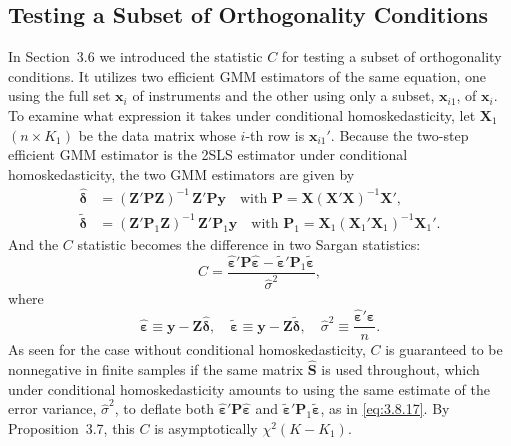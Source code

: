 \subsection*{Testing a Subset of Orthogonality Conditions}

In Section~3.6 we introduced the statistic $C$ for testing a subset of orthogonality
conditions.  It utilizes two efficient GMM estimators of the same equation, one
using the full set $\mathbf{x}_i$ of instruments and the other using only a subset, $\mathbf{x}_{i1}$,
of $\mathbf{x}_i$.  To examine what expression it takes under conditional homoskedasticity, let
$\mathbf{X}_1$ $(n \times K_1)$ be the data matrix whose $i$-th row is $\mathbf{x}_{i1}'$.  Because the
two-step efficient GMM estimator is the 2SLS estimator under conditional homoskedasticity,
the two GMM estimators are given by
\begin{align}
  \hat{\boldsymbol{\delta}}
  &= (\mathbf{Z}'\mathbf{P}\mathbf{Z})^{-1}\, \mathbf{Z}'\mathbf{P}\mathbf{y}
  \quad \text{with } \mathbf{P}
  = \mathbf{X}(\mathbf{X}'\mathbf{X})^{-1}\mathbf{X}',
  \label{eq:3.8.15} \\
  \tilde{\boldsymbol{\delta}}
  &= (\mathbf{Z}'\mathbf{P}_1\mathbf{Z})^{-1}\, \mathbf{Z}'\mathbf{P}_1\mathbf{y}
  \quad \text{with } \mathbf{P}_1
  = \mathbf{X}_1(\mathbf{X}_1'\mathbf{X}_1)^{-1}\mathbf{X}_1'.
  \label{eq:3.8.16}
\end{align}
And the $C$ statistic becomes the difference in two Sargan statistics:
\begin{equation}
  C = \frac{\hat{\boldsymbol{\varepsilon}}'\mathbf{P}\hat{\boldsymbol{\varepsilon}}
    - \tilde{\boldsymbol{\varepsilon}}'\mathbf{P}_1\tilde{\boldsymbol{\varepsilon}}}
    {\hat{\sigma}^2},
  \label{eq:3.8.17}
\end{equation}
where
\[
  \hat{\boldsymbol{\varepsilon}} \equiv \mathbf{y}
  - \mathbf{Z}\hat{\boldsymbol{\delta}}, \quad
  \tilde{\boldsymbol{\varepsilon}} \equiv \mathbf{y}
  - \mathbf{Z}\tilde{\boldsymbol{\delta}}, \quad
  \hat{\sigma}^2 \equiv \frac{\hat{\boldsymbol{\varepsilon}}'\hat{\boldsymbol{\varepsilon}}}{n}.
\]
As seen for the case without conditional homoskedasticity, $C$ is guaranteed to be
nonnegative in finite samples if the same matrix $\hat{\mathbf{S}}$ is used throughout, which under
conditional homoskedasticity amounts to using the same estimate of the error variance,
$\hat{\sigma}^2$, to deflate both
$\hat{\boldsymbol{\varepsilon}}'\mathbf{P}\hat{\boldsymbol{\varepsilon}}$ and
$\tilde{\boldsymbol{\varepsilon}}'\mathbf{P}_1\tilde{\boldsymbol{\varepsilon}}$, as in
\eqref{eq:3.8.17}.  By Proposition~3.7, this $C$ is asymptotically $\chi^2(K - K_1)$.

